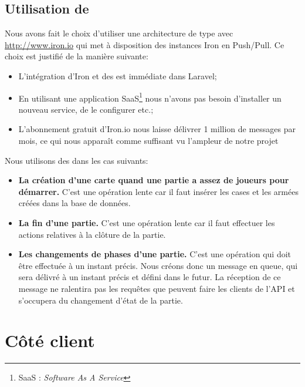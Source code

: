 	\subsection{Utilisation de \ppq{}}
		Nous avons fait le choix d'utiliser une architecture de type \ppq{} avec \url{http://www.iron.io} qui met à disposition des instances Iron en Push/Pull. Ce choix est justifié de la manière suivante:
		\begin{itemize}
			\item L'intégration d'Iron et des \ppq{} est immédiate dans Laravel;
			\item En utilisant une application SaaS\footnote{SaaS : \textit{Software As A Service}} nous n'avons pas besoin d'installer un nouveau service, de le configurer etc.;
			\item L'abonnement gratuit d'Iron.io nous laisse délivrer 1 million de messages par mois, ce qui nous apparaît comme suffisant vu l'ampleur de notre projet
		\end{itemize}\bigskip

		Nous utilisons des \ppq{} dans les cas suivants:
		\begin{itemize}
			\item \textbf{La création d'une carte quand une partie a assez de joueurs pour démarrer.} C'est une opération lente car il faut insérer les cases et les armées créées dans la base de données.
			\item \textbf{La fin d'une partie.} C'est une opération lente car il faut effectuer les actions relatives à la clôture de la partie.
			\item \textbf{Les changements de phases d'une partie.} C'est une opération qui doit être effectuée à un instant précis. Nous créons donc un message en queue, qui sera délivré à un instant précis et défini dans le futur. La réception de ce message ne ralentira pas les requêtes que peuvent faire les clients de l'API et s'occupera du changement d'état de la partie.
		\end{itemize}
\section{Côté client}
